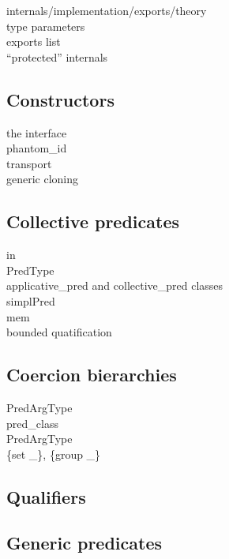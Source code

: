 internals/implementation/exports/theory\\
type parameters\\
exports list\\
``protected'' internals

\subsection{Constructors}

the interface\\
phantom\_id\\
transport\\
generic cloning

\mcbPROVIDE{\\in}

\subsection{Collective predicates}
in\\
PredType\\
applicative\_pred and collective\_pred classes\\
simplPred\\
mem\\
bounded quatification

\subsection{Coercion bierarchies}

PredArgType\\
pred\_class\\
PredArgType\\
\{set \_\}, \{group \_\}

\subsection{Qualifiers}
\subsection{Generic predicates}


